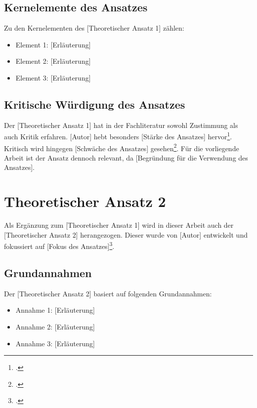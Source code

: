 \subsection{Kernelemente des Ansatzes}
\label{subsec:kernelemente}

Zu den Kernelementen des [Theoretischer Ansatz 1] zählen:

\begin{itemize}
    \item Element 1: [Erläuterung]
    \item Element 2: [Erläuterung]
    \item Element 3: [Erläuterung]
\end{itemize}

\subsection{Kritische Würdigung des Ansatzes}
\label{subsec:kritische_wuerdigung}

Der [Theoretischer Ansatz 1] hat in der Fachliteratur sowohl Zustimmung als auch Kritik erfahren. [Autor] hebt besonders [Stärke des Ansatzes] hervor\footcite[S. XX]{Quelle5}. Kritisch wird hingegen [Schwäche des Ansatzes] gesehen\footcite[S. XX]{Quelle6}. Für die vorliegende Arbeit ist der Ansatz dennoch relevant, da [Begründung für die Verwendung des Ansatzes].

\section{Theoretischer Ansatz 2}
\label{sec:theoretischer_ansatz2}

Als Ergänzung zum [Theoretischer Ansatz 1] wird in dieser Arbeit auch der [Theoretischer Ansatz 2] herangezogen. Dieser wurde von [Autor] entwickelt und fokussiert auf [Fokus des Ansatzes]\footcite[S. XX]{Quelle7}.

\subsection{Grundannahmen}
\label{subsec:grundannahmen}

Der [Theoretischer Ansatz 2] basiert auf folgenden Grundannahmen:

\begin{itemize}
    \item Annahme 1: [Erläuterung]
    \item Annahme 2: [Erläuterung]
    \item Annahme 3: [Erläuterung]
\end{itemize}


